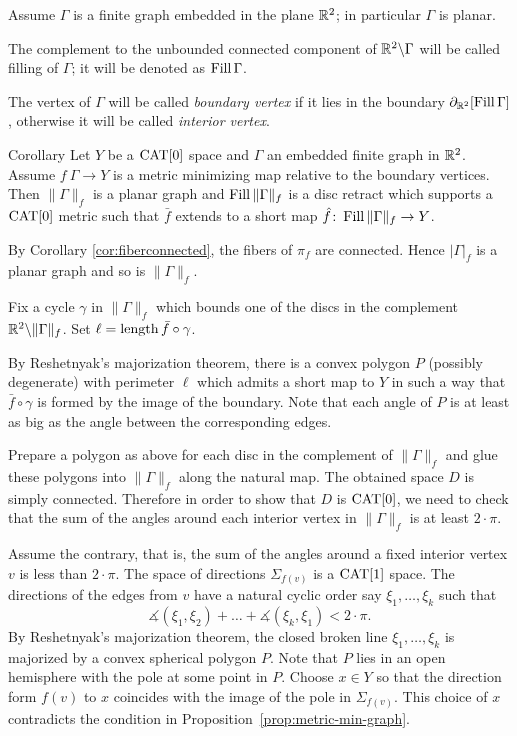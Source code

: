 \documentclass{article}
\begin{document}
Assume $\Gamma$ is a finite graph embedded in the plane $\mathbb{R}^2$;
in particular $\Gamma$ is planar.

The complement to the unbounded connected component of $\mathbb{R}^2\backslash\Gamma$ will be called filling of $\Gamma$;
it will be denoted as $\mathop{\rm Fill}\Gamma$.

The vertex of $\Gamma$ will be called \emph{boundary vertex}
if it lies in the boundary $\partial_{\mathbb{R}^2}[\mathop{\rm Fill}\Gamma]$,
otherwise it will be called \emph{interior vertex}.

\begin{thm}{Corollary}\label{cor:planar-minimizing-graph}
Let $Y$ be a $\mathop{\rm CAT}\nolimits[0]$ space and
$\Gamma$ an embedded finite graph in $\mathbb{R}^2$.
Assume $f\:\Gamma\to Y$ is a metric minimizing map relative to the boundary vertices. 
Then $\|\Gamma\|_f$ is a planar graph and
$\mathop{\rm Fill}\|\Gamma\|_f$ is a disc retract which supports a $\mathop{\rm CAT}\nolimits[0]$ metric such that 
 $\bar f$ extends to a short map $\hat f\colon\mathop{\rm Fill}\|\Gamma\|_f\to Y$.
\end{thm}


By Corollary \ref{cor:fiberconnected}, the fibers of $\pi_f$ are connected.
Hence $|\Gamma|_f$ is 
a planar graph and so is $\|\Gamma\|_f$.


Fix a cycle $\gamma$ in $\|\Gamma\|_f$ which bounds one of the discs in the complement $\mathbb{R}^2\backslash \|\Gamma\|_f$.
Set $\ell=\mathop{\rm length}\nolimits \bar f\circ\gamma$.

By Reshetnyak's majorization theorem, there is a convex polygon $P$ (possibly degenerate) with perimeter $\ell$ which admits 
a short map to $Y$ in such a way that $\bar f\circ\gamma$ is formed by the image of the boundary.
Note that each angle of $P$ is at least as big as 
the angle between the corresponding edges.

Prepare a polygon as above for each disc in the complement of $\|\Gamma\|_f$
and glue these polygons into $\|\Gamma\|_f$ along the natural map.
The obtained space $D$ is simply connected.
Therefore in order to show that $D$ is $\mathop{\rm CAT}\nolimits[0]$,
we need to check that the sum of the angles around each interior vertex in $\|\Gamma\|_f$ is at least $2\cdot\pi$.


Assume the contrary, that is, 
the sum of the angles around a fixed interior vertex $v$ is less than $2\cdot\pi$.
The space of directions $\Sigma_{f(v)}$ is a $\mathop{\rm CAT}\nolimits[1]$ space.
The directions of the edges from $v$ have a natural
cyclic order say $\xi_1,\dots,\xi_k$
such that
\[\measuredangle(\xi_1,\xi_2)+\dots+\measuredangle(\xi_k,\xi_1)<2\cdot\pi.\]
By Reshetnyak's majorization theorem,
the closed broken line $\xi_1,\dots,\xi_k$ is majorized by a convex spherical polygon $P$.
Note that $P$ lies in an open hemisphere with the pole  at some point in $P$.
Choose $x\in Y$ so that the direction form $f(v)$ to $x$ coincides with the image of the pole in $\Sigma_{f(v)}$.
This choice of $x$ contradicts the condition in Proposition~\ref{prop:metric-min-graph}.
\end{document}
